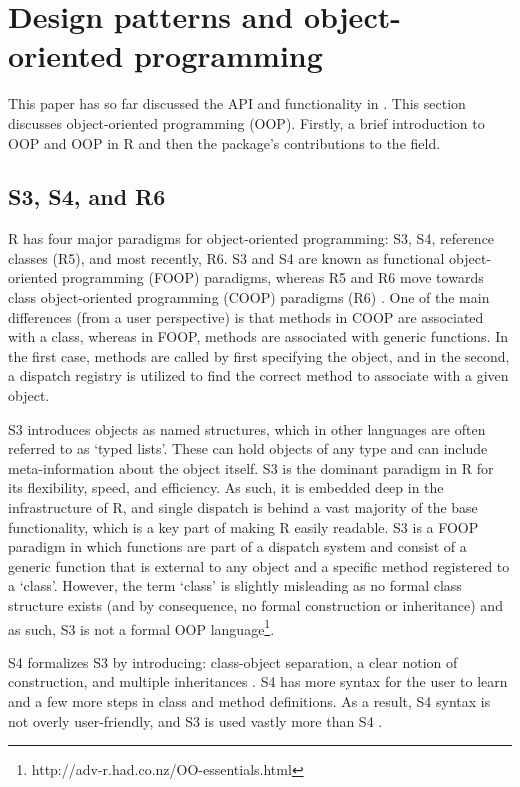 \section{Design patterns and object-oriented programming}
\label{sec:tools_distr6_patterns}

This paper has so far discussed the API and functionality in . This section discusses object-oriented programming (OOP). Firstly, a brief introduction to OOP and OOP in R and then the package's contributions to the field.


\subsection{S3, S4, and R6}
\label{sec:tools_distr6_oop}

R has four major paradigms for object-oriented programming: S3, S4, reference classes (R5), and most recently, R6. S3 and S4 are known as functional object-oriented programming (FOOP) paradigms, whereas R5 and R6 move towards class object-oriented programming (COOP) paradigms (R6) \citep{Chambers2014}. One of the main differences (from a user perspective) is that methods in COOP are associated with a class, whereas in FOOP, methods are associated with generic functions. In the first case, methods are called by first specifying the object, and in the second, a dispatch registry is utilized to find the correct method to associate with a given object.

S3 introduces objects as named structures, which in other languages are often referred to as `typed lists'. These can hold objects of any type and can include meta-information about the object itself. S3 is the dominant paradigm in R for its flexibility, speed, and efficiency. As such, it is embedded deep in the infrastructure of R, and single dispatch is behind a vast majority of the base functionality, which is a key part of making R easily readable. S3 is a FOOP paradigm in which functions are part of a dispatch system and consist of a generic function that is external to any object and a specific method registered to a `class'. However, the term `class' is slightly misleading as no formal class structure exists (and by consequence, no formal construction or inheritance) and as such, S3 is not a formal OOP language\footnote{http://adv-r.had.co.nz/OO-essentials.html}.

S4 formalizes S3 by introducing: class-object separation, a clear notion of construction, and multiple inheritances \citep{Chambers2014}. S4 has more syntax for the user to learn and a few more steps in class and method definitions. As a result, S4 syntax is not overly user-friendly, and S3 is used vastly more than S4 \citep{Chambers2014}.

